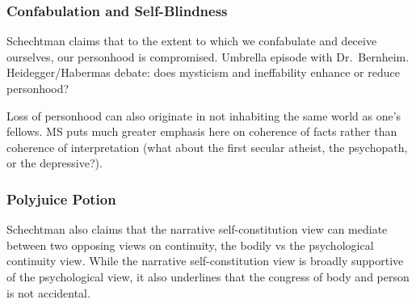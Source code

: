\documentclass[xcolor=dvipsnames]{beamer}
\begin{document}
\begin{frame}
  \frametitle{Confabulation and Self-Blindness}
  Schechtman claims that to the extent to which we confabulate and
  deceive ourselves, our personhood is compromised. Umbrella episode
  with Dr.\ Bernheim. Heidegger/Habermas debate: does mysticism and
  ineffability enhance or reduce personhood?

  \bigskip

  Loss of personhood can also originate in not inhabiting the same
  world as one's fellows. MS puts much greater emphasis here on
  coherence of facts rather than coherence of interpretation (what
  about the first secular atheist, the psychopath, or the
  depressive?). 
\end{frame}

\begin{frame}
  \frametitle{Polyjuice Potion}
  Schechtman also claims that the narrative self-constitution view can
  mediate between two opposing views on continuity, the bodily vs the
  psychological continuity view. While the narrative self-constitution
  view is broadly supportive of the psychological view, it also
  underlines that the congress of body and person is not accidental.
\end{frame}
\end{document}
